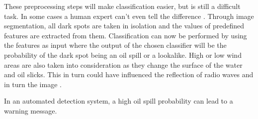 These preprocessing steps will make classification easier, but is still a difficult task. In some cases a human expert can't even tell the difference \cite{Keramitsoglou2006640}. Through image segmentation, all dark spots are taken in isolation and the values of predefined features are extracted from them. Classification can now be performed by using the features as input where the output of the chosen classifier will be the probability of the dark spot being an oil spill or a lookalike. %
High or low wind areas are also taken into consideration as they change the surface of the water and oil slicks. This in turn could have influenced the reflection of radio waves and in turn the image \cite{fingas2014review}.

In an automated detection system, a high oil spill probability can lead to a warning message.



